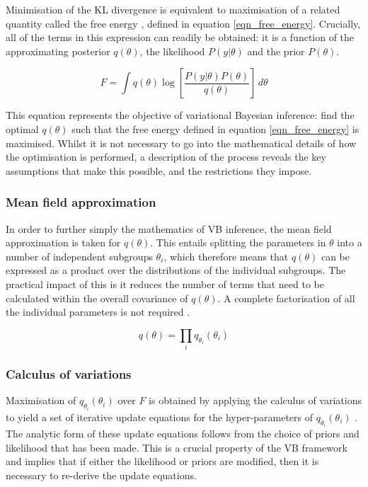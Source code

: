 Minimisation of the KL divergence is equivalent to maximisation of a related quantity called the free energy \cite{Chappell2009}, defined in equation \ref{eqn_free_energy}. Crucially, all of the terms in this expression can readily be obtained: it is a function of the approximating posterior $q(\theta)$, the likelihood $P(y|\theta)$ and the prior $P(\theta)$. 

\begin{equation} 
F = \int q(\theta) \log{ \left[ \frac{ P(y|\theta) P(\theta) }{ q(\theta) } \right] } \, d\theta
\label{eqn_free_energy}
\end{equation}

This equation represents the objective of variational Bayesian inference: find the optimal $q(\theta)$ such that the free energy defined in equation \ref{eqn_free_energy} is maximised. Whilst it is not necessary to go into the mathematical details of how the optimisation is performed, a description of the process reveals the key assumptions that make this possible, and the restrictions they impose. 

\subsubsection{Mean field approximation}

In order to further simply the mathematics of VB inference, the mean field approximation is taken for $q(\theta)$. This entails splitting the parameters in $\theta$ into a number of independent subgroups $\theta_i$, which therefore means that $q(\theta)$ can be expressed as a product over the distributions of the individual subgroups. The practical impact of this is it reduces the number of terms that need to be calculated within the overall covariance of $q(\theta)$. A complete factorisation of all the individual parameters is not required \cite{Attias2000}. 

\begin{equation}
q(\theta) = \prod_i q_{\theta_i}(\theta_i)
\end{equation}

\subsubsection{Calculus of variations}

Maximisation of $q_{\theta_i}(\theta_i)$ over $F$ is obtained by applying the calculus of variations to yield a set of iterative update equations for the hyper-parameters of $q_{\theta_i}(\theta_i)$ \cite{Chappell2009}. The analytic form of these update equations follows from the choice of priors and likelihood that has been made. This is a crucial property of the VB framework and implies that if either the likelihood or priors are modified, then it is necessary to re-derive the update equations. 

